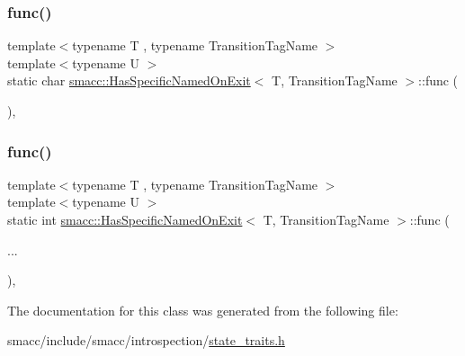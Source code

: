 \subsubsection{\texorpdfstring{func()}{func()}\hspace{0.1cm}{\footnotesize\ttfamily [1/2]}}
{\footnotesize\ttfamily template$<$typename T , typename Transition\+Tag\+Name $>$ \\
template$<$typename U $>$ \\
static char \hyperlink{classsmacc_1_1HasSpecificNamedOnExit}{smacc\+::\+Has\+Specific\+Named\+On\+Exit}$<$ T, Transition\+Tag\+Name $>$\+::func (\begin{DoxyParamCaption}\item[{\hyperlink{structsmacc_1_1HasSpecificNamedOnExit_1_1Check}{Check}$<$ U, \&U\+::on\+Exit $>$ $\ast$}]{ }\end{DoxyParamCaption})\hspace{0.3cm}{\ttfamily [static]}, {\ttfamily [private]}}

\mbox{\label{classsmacc_1_1HasSpecificNamedOnExit_a5df0edab149c42bfd6e5a7221150095a}} 
\subsubsection{\texorpdfstring{func()}{func()}\hspace{0.1cm}{\footnotesize\ttfamily [2/2]}}
{\footnotesize\ttfamily template$<$typename T , typename Transition\+Tag\+Name $>$ \\
template$<$typename U $>$ \\
static int \hyperlink{classsmacc_1_1HasSpecificNamedOnExit}{smacc\+::\+Has\+Specific\+Named\+On\+Exit}$<$ T, Transition\+Tag\+Name $>$\+::func (\begin{DoxyParamCaption}\item[{}]{... }\end{DoxyParamCaption})\hspace{0.3cm}{\ttfamily [static]}, {\ttfamily [private]}}



The documentation for this class was generated from the following file\+:\begin{DoxyCompactItemize}
\item 
smacc/include/smacc/introspection/\hyperlink{state__traits_8h}{state\+\_\+traits.\+h}\end{DoxyCompactItemize}
